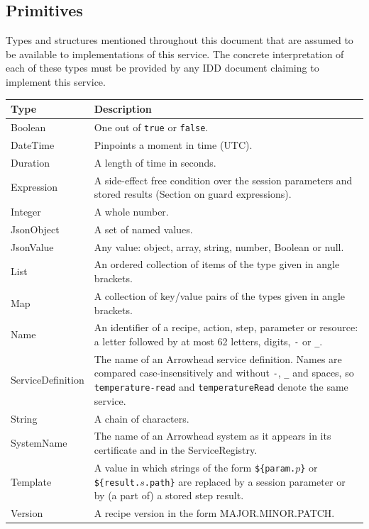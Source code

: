 \documentclass[a4paper]{arrowhead}
\newcommand{\pdef}[1]{{\textcolor{ArrowheadGrey}{#1\label{sec:model:primitives:#1}\label{sec:model:primitives:#1s}\label{sec:model:primitives:#1es}}}}
\begin{document}
\subsection{Primitives}
\label{sec:model:primitives}
Types and structures mentioned throughout this document that are assumed to be available to implementations of this
service. The concrete interpretation of each of these types must be provided by any IDD document claiming to implement
this service.

{\small
\begin{longtable}{|p{3.2cm}|p{12.6cm}|}

\hline
\rowcolor{gray!33} Type & Description \\ \hline
\endhead
\pdef{Boolean} & One out of \texttt{true} or \texttt{false}. \\ \hline
\pdef{DateTime} & Pinpoints a moment in time (UTC). \\ \hline
\pdef{Duration} & A length of time in seconds. \\ \hline
\pdef{Expression} & A side-effect free condition over the session parameters and stored results (Section on guard expressions). \\ \hline
\pdef{Integer} & A whole number. \\ \hline
\pdef{JsonObject} & A set of named values. \\ \hline
\pdef{JsonValue} & Any value: object, array, string, number, Boolean or null. \\ \hline
\pdef{List} & An ordered collection of items of the type given in angle brackets. \\ \hline
\pdef{Map} & A collection of key/value pairs of the types given in angle brackets. \\ \hline
\pdef{Name} & An identifier of a recipe, action, step, parameter or resource: a letter followed by at most 62 letters, digits, \texttt{-} or \texttt{\_}. \\ \hline
\pdef{ServiceDefinition} & The name of an Arrowhead service definition. Names are compared case-insensitively and without \texttt{-}, \texttt{\_} and spaces, so \texttt{temperature-read} and \texttt{temperatureRead} denote the same service. \\ \hline
\pdef{String} & A chain of characters. \\ \hline
\pdef{SystemName} & The name of an Arrowhead system as it appears in its certificate and in the ServiceRegistry. \\ \hline
\pdef{Template} & A value in which strings of the form \texttt{\$\{param.$p$\}} or \texttt{\$\{result.$s$.path\}} are replaced by a session parameter or by (a part of) a stored step result. \\ \hline
\pdef{Version} & A recipe version in the form MAJOR.MINOR.PATCH. \\ \hline
\end{longtable}
}
\end{document}
